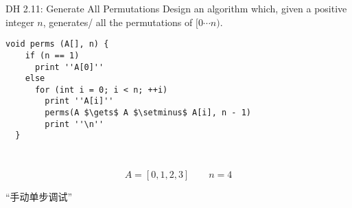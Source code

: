 \begin{frame}{}
  \begin{description}
    \centering
    \item[\Large Generating All Permutations]
  \end{description}

\end{frame}

\begin{frame}[fragile]{}
  \begin{exampleblock}{DH 2.11: Generate All Permutations}
    Design an algorithm which, given a positive integer $n$,
    generates/ all the permutations of $[0 \cdots n)$.
  \end{exampleblock}

  \pause
  \begin{lstlisting}[style = Cstyle]
  void perms (A[], n) {
    if (n == 1)
      print ''A[0]''
    else 
      for (int i = 0; i < n; ++i)
        print ''A[i]''
        perms(A $\gets$ A $\setminus$ A[i], n - 1)
        print ''\n''
  }
  \end{lstlisting}

  \vspace{0.30cm}
  \pause
  \begin{center}
    \href{https://github.com/hengxin/learning-c/blob/master/problems/permutation/generate-perms.c}{\texttt{}}
  \end{center}
\end{frame}

\begin{frame}{}
  \begin{columns}
      \begin{center}
	\href{}{\texttt{}}
      \end{center}
    \pause
  \end{columns}
\end{frame}

\begin{frame}{}
  \[
    A = [0,1,2,3] \qquad n = 4
  \]


  \begin{center}
    ``手动单步调试''
  \end{center}
\end{frame}

